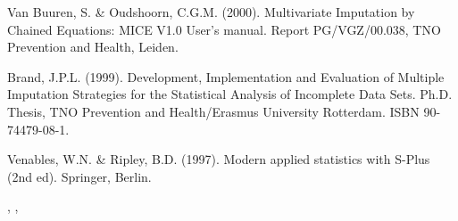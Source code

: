 \begin{References}\relax
Van Buuren, S. \& Oudshoorn, C.G.M. (2000). Multivariate Imputation by Chained Equations: 
MICE V1.0 User's manual. Report PG/VGZ/00.038, TNO Prevention and Health, Leiden.

Brand, J.P.L. (1999). Development, Implementation and Evaluation
of Multiple
Imputation Strategies for the Statistical Analysis of Incomplete
Data Sets.
Ph.D. Thesis, TNO Prevention and Health/Erasmus University Rotterdam. ISBN 90-74479-08-1. 

Venables, W.N. \& Ripley, B.D. (1997). Modern applied statistics with S-Plus (2nd ed). Springer, Berlin.
\end{References}
\begin{SeeAlso}\relax
{}, , 
\end{SeeAlso}

